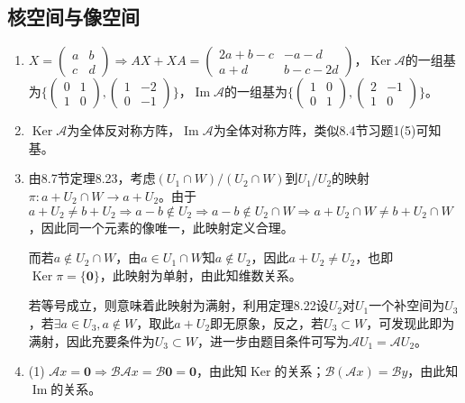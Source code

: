 \documentclass[a4paper,UTF8,fontset=windows]{ctexart}
\DeclareMathOperator{\im}{Im}
\DeclareMathOperator{\Ker}{Ker}
\begin{document}
\subsection{核空间与像空间}
\begin{enumerate}
\item
$X=\begin{pmatrix}a&b\\c&d\end{pmatrix}\Rightarrow AX+XA=\begin{pmatrix}2a+b-c&-a-d\\a+d&b-c-2d\end{pmatrix}$，$\Ker\mathcal{A}$的一组基为$\{\begin{pmatrix}0&1\\1&0\end{pmatrix},\begin{pmatrix}1&-2\\0&-1\end{pmatrix}\}$，$\im\mathcal{A}$的一组基为$\{\begin{pmatrix}1&0\\0&1\end{pmatrix},\begin{pmatrix}2&-1\\1&0\end{pmatrix}\}$。

\item
$\Ker\mathcal{A}$为全体反对称方阵，$\im\mathcal{A}$为全体对称方阵，类似8.4节习题1(5)可知基。

\item
由8.7节定理8.23，考虑$(U_1\cap W)/(U_2\cap W)$到$U_1/U_2$的映射$\pi:a+U_2\cap W\to a+U_2$。由于$a+U_2\ne b+U_2\Rightarrow a-b\notin U_2\Rightarrow a-b\notin U_2\cap W\Rightarrow a+U_2\cap W\ne b+U_2\cap W$，因此同一个元素的像唯一，此映射定义合理。

而若$a\notin U_2\cap W$，由$a\in U_1\cap W$知$a\notin U_2$，因此$a+U_2\ne U_2$，也即$\Ker\pi=\{\mathbf{0}\}$，此映射为单射，由此知维数关系。

若等号成立，则意味着此映射为满射，利用定理8.22设$U_2$对$U_1$一个补空间为$U_3$，若$\exists a\in U_3,a\notin W$，取此$a+U_2$即无原象，反之，若$U_3\subset W$，可发现此即为满射，因此充要条件为$U_3\subset W$，进一步由题目条件可写为$\mathcal{A}U_1=\mathcal{A}U_2$。

\item
(1) $\mathcal{A}x=\mathbf{0}\Rightarrow\mathcal{B}\mathcal{A}x=\mathcal{B}\mathbf{0}=\mathbf{0}$，由此知$\Ker$的关系；$\mathcal{B}(\mathcal{A}x)=\mathcal{B}y$，由此知$\im$的关系。


\end{enumerate}
\end{document}
